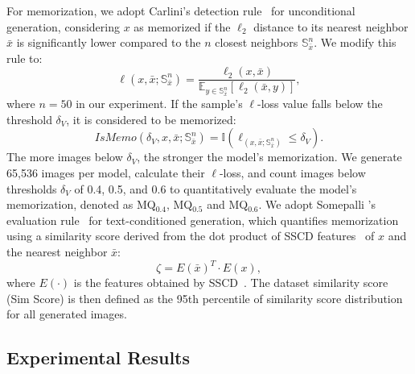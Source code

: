 \textbf{} 
 For memorization, we adopt Carlini's detection rule~\cite{carlini2023extracting} for unconditional generation, considering 
$x$ as memorized if the $\ell_{2}$ distance to its nearest neighbor $\bar{x}$ is significantly lower compared to the $n$ closest neighbors $\mathbb{S}^n_{\bar{x}}$. We modify this rule to:
\begin{equation}
\ell(x,\bar{x};\mathbb{S}^n_{\bar{x}}) = \frac{\ell_{2}(x,\bar{x})}{\mathbb{E}_{y\in{\mathbb{S}^n_{\bar{x}}}}[\ell_{2}(\bar{x},y)]},
  \label{eq:attack}
\end{equation}
where $n = 50$ in our experiment. If the sample's $\ell$-loss value falls below the threshold $\delta_{V}$, it is considered to be memorized:
\begin{equation}
    IsMemo(\delta_{V}, x,\bar{x};\mathbb{S}^n_{\bar{x}}) = \mathbb{I}(\ell_(x,\bar{x};\mathbb{S}^n_{\bar{x}})\leq\delta_{V}).
  \label{eq:attack_threshold}
\end{equation}
The more images below $\delta_{V}$, the stronger the model's memorization.
We generate 65,536 images per model, calculate their $\ell$-loss, and count images below thresholds $\delta_{V}$ of 0.4, 0.5, and 0.6 to quantitatively evaluate the model's memorization, denoted as MQ$_{0.4}$, MQ$_{0.5}$ and MQ$_{0.6}$.
We adopt Somepalli 's evaluation rule~\cite{somepalli2024understanding} for text-conditioned generation, which quantifies memorization using a similarity score derived from the dot product of SSCD features~\cite{pizzi2022self} of $x$ and the nearest neighbor $\bar{x}$:
\begin{equation}
    \zeta = E(\bar{x})^T \cdot E(x),
\end{equation}
where $E(\cdot)$ is the features obtained by SSCD~\cite{pizzi2022self}.  The dataset similarity score (Sim Score) is then defined as the 95th percentile of similarity score distribution for all generated images.

\subsection{Experimental Results}
\label{sec:result}
